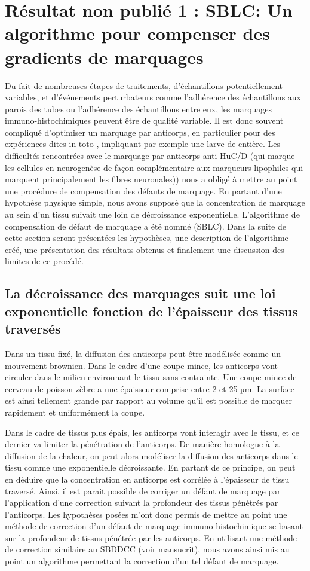 \documentclass[\main/main.tex]{subfiles}
\begin{document}
\chapter{Résultat non publié 1 :
SBLC: Un algorithme pour compenser des gradients de marquages 
\label{sec:sblc}
}

%
%
Du fait de nombreuses étapes de traitements, d'échantillons potentiellement variables, et d'événements perturbateurs comme l'adhérence des échantillons aux parois des tubes ou l'adhérence des échantillons entre eux, les marquages immuno-histochimiques peuvent être de qualité variable. Il est donc souvent compliqué d'optimiser un marquage par anticorps, en particulier pour des expériences dites in toto , impliquant par exemple une larve de \pz{} entière.
%
Les difficultés rencontrées avec le marquage par anticorps anti-HuC/D (qui marque les cellules en neurogenèse de façon complémentaire aux marqueurs lipophiles qui marquent principalement les fibres neuronales)) nous a obligé à mettre au point une procédure de compensation des défauts de marquage.
En partant d'une hypothèse physique simple, nous avons supposé que la concentration de marquage au sein d'un tissu suivait une loin de décroissance exponentielle.
%
L'algorithme de compensation de défaut de marquage
a été nommé \sblc{} (SBLC).
%
Dans la suite de cette section seront présentées les hypothèses, une description de l'algorithme créé, une présentation des résultats obtenus et finalement une discussion des limites de ce procédé.

    \section{La décroissance des marquages suit une loi exponentielle fonction de l'épaisseur des tissus traversés}
  
%
Dans un tissu fixé, la diffusion des anticorps peut être modélisée 
comme un mouvement brownien.
%
Dans le cadre d'une coupe mince, les anticorps vont circuler dans le milieu environnant le tissu sans contrainte.
%
Une coupe mince de cerveau de poisson-zèbre a une épaisseur comprise entre  2 et 25 µm.
%
La surface est ainsi tellement grande par rapport au volume qu'il est possible de marquer rapidement et uniformément la coupe.

%
Dans le cadre de tissus plus épais, les anticorps vont interagir avec le tissu, et ce dernier va limiter la pénétration de l'anticorps.
%
De manière homologue à la diffusion de la chaleur, on peut alors modéliser la diffusion des anticorps dans le tissu comme une exponentielle décroissante.
%
En partant de ce principe, on peut en déduire que la concentration en anticorps est corrélée à l'épaisseur de tissu traversé.
%
Ainsi, il est parait possible de corriger un défaut de marquage par l'application d'une correction suivant la profondeur des tissus pénétrés par l'anticorps.
%
Les hypothèses posées m'ont donc permis de mettre au point une méthode de correction d'un défaut de marquage immuno-histochimique se basant sur la profondeur de tissus pénétrée par les anticorps.
%
En utilisant une méthode de correction similaire au SBDDCC (voir mansucrit), nous avons ainsi mis au point un algorithme permettant la correction d'un tel défaut de marquage.
    
\end{document}
